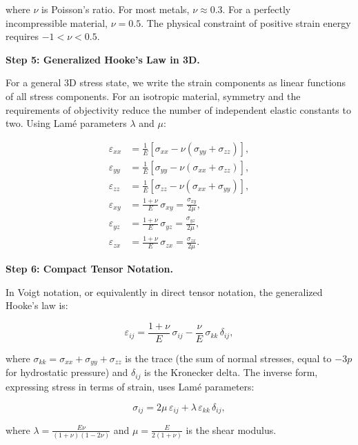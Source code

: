 where $\nu$ is Poisson's ratio. For most metals, $\nu \approx 0.3$. For a perfectly incompressible material, $\nu = 0.5$. The physical constraint of positive strain energy requires $-1 < \nu < 0.5$.

\textbf{Step 5: Generalized Hooke's Law in 3D.}

For a general 3D stress state, we write the strain components as linear functions of all stress components. For an isotropic material, symmetry and the requirements of objectivity reduce the number of independent elastic constants to two. Using Lam\'e parameters $\lambda$ and $\mu$:

\begin{align}
\varepsilon_{xx} &= \frac{1}{E}\left[\sigma_{xx} - \nu(\sigma_{yy} + \sigma_{zz})\right], \\
\varepsilon_{yy} &= \frac{1}{E}\left[\sigma_{yy} - \nu(\sigma_{xx} + \sigma_{zz})\right], \\
\varepsilon_{zz} &= \frac{1}{E}\left[\sigma_{zz} - \nu(\sigma_{xx} + \sigma_{yy})\right], \\
\varepsilon_{xy} &= \frac{1 + \nu}{E}\,\sigma_{xy} = \frac{\sigma_{xy}}{2\mu}, \\
\varepsilon_{yz} &= \frac{1 + \nu}{E}\,\sigma_{yz} = \frac{\sigma_{yz}}{2\mu}, \\
\varepsilon_{zx} &= \frac{1 + \nu}{E}\,\sigma_{zx} = \frac{\sigma_{zx}}{2\mu}.
\end{align}

\textbf{Step 6: Compact Tensor Notation.}

In Voigt notation, or equivalently in direct tensor notation, the generalized Hooke's law is:

\begin{equation}
\varepsilon_{ij} = \frac{1+\nu}{E}\,\sigma_{ij} - \frac{\nu}{E}\,\sigma_{kk}\,\delta_{ij},
\end{equation}

where $\sigma_{kk} = \sigma_{xx} + \sigma_{yy} + \sigma_{zz}$ is the trace (the sum of normal stresses, equal to $-3p$ for hydrostatic pressure) and $\delta_{ij}$ is the Kronecker delta. The inverse form, expressing stress in terms of strain, uses Lam\'e parameters:

\begin{equation}
\sigma_{ij} = 2\mu\,\varepsilon_{ij} + \lambda\,\varepsilon_{kk}\,\delta_{ij},
\end{equation}

where $\lambda = \frac{E\nu}{(1+\nu)(1-2\nu)}$ and $\mu = \frac{E}{2(1+\nu)}$ is the shear modulus.


